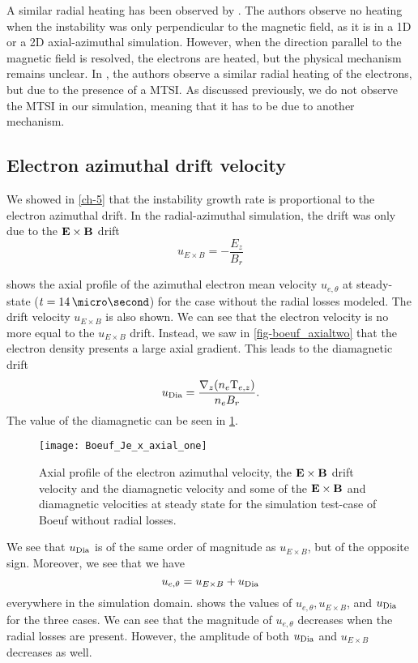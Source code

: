   A similar radial heating has been observed by \citet{heron2013}.
  The authors observe no heating when the instability was only perpendicular to the magnetic field, as it is in a \ac{1D} or a \ac{2D} axial-azimuthal simulation.
  However, when the direction parallel to the magnetic field is resolved, the electrons are heated, but the physical mechanism remains unclear.
  In \citet{janhunen}, the authors observe a similar radial heating of the electrons, but due to the presence of a \ac{MTSI}.
  As discussed previously, we do not observe the \ac{MTSI} in our simulation, meaning that it has to be due to another mechanism.


  \subsection{Electron azimuthal drift velocity} \label{subsec-drift}

  We showed in \cref{ch-5} that the instability growth rate is proportional to the electron azimuthal drift.
  In the radial-azimuthal simulation, the drift was only due to the ${\mathbf E} \times {\mathbf B}$ drift
  \begin{equation} \label{eq-exbdrift}
    u_{E \times B} = - \frac{E_z}{B_r}
  \end{equation}

   shows the axial profile of the azimuthal electron mean velocity $u_{e, \theta}$ at steady-state ($t = 14\,\micro\second$) for the case without the radial losses modeled.
  The drift velocity $u_{E \times B}$ is also shown.
  We can see that the electron velocity is no more equal to the $u_{E \times B}$ drift.
  Instead, we saw in \cref{fig-boeuf_axialtwo} that the electron density presents a large axial gradient.
  This leads to the diamagnetic drift
  $$u_{\rm Dia}=\frac{\nabla_z (n_e {\rm T}_{e,z})}{n_e B_r}.$$
  The value of the diamagnetic can be seen in \cref{fig-Jetheta_sum}.


  \begin{figure}[hbtp]
    \centering
    \texttt{[image: Boeuf\_Je\_x\_axial\_one]}
    \caption{Axial profile of the electron azimuthal velocity, the ${\mathbf E} \times {\mathbf B}$ drift velocity and the diamagnetic velocity and some of the ${\mathbf E} \times {\mathbf B}$ and diamagnetic velocities at steady state for the simulation test-case of Boeuf without radial losses.}
    \label{fig-Jetheta_sum}
  \end{figure}


  We see that $u_{\rm Dia}$ is of the same order of magnitude as $u_{E \times B}$, but of the opposite sign.
  Moreover, we see that we have 
  $$ u_{e, \theta} =   u_{E \times B} + u_{\rm Dia}$$
  everywhere in the simulation domain.
   shows the values of $ u_{e, \theta},   u_{E \times B}$, and $u_{\rm Dia}$ for the three cases.
  We can see that the magnitude of $u_{e, \theta} $ decreases when the radial losses are present.
  However, the amplitude of both $u_{\rm Dia}$ and $u_{E \times B}$ decreases as well.


